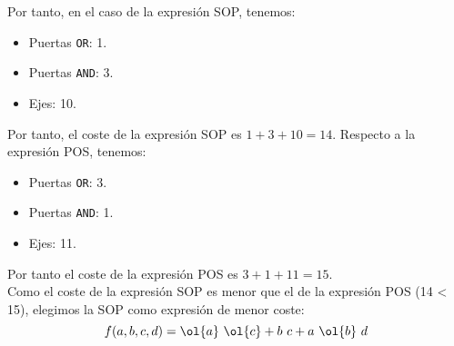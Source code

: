 \documentclass[12pt]{article}
\begin{document}
\begin{ejercicio}
        Por tanto, en el caso de la expresión SOP, tenemos:
        \begin{itemize}
            \item Puertas \verb|OR|: 1.
            \item Puertas \verb|AND|: 3.
            \item Ejes: 10.
        \end{itemize}
        Por tanto, el coste de la expresión SOP es $1+3+10=14$.
        Respecto a la expresión POS, tenemos:
        \begin{itemize}
            \item Puertas \verb|OR|: 3.
            \item Puertas \verb|AND|: 1.
            \item Ejes: 11.
        \end{itemize}
        Por tanto el coste de la expresión POS es $3+1+11=15$.\\

        Como el coste de la expresión SOP es menor que el de la expresión POS (14 < 15), elegimos la SOP como expresión de menor coste:
        \begin{equation*}
            f(a, b, c, d) = \ol{a}~\ol{c} + b~c + a~\ol{b}~d
        \end{equation*}
        
    \end{ejercicio}
\end{document}

